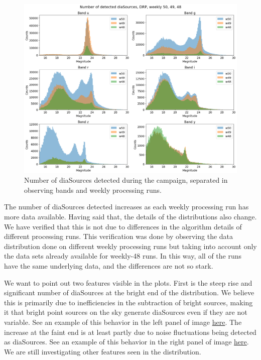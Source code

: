 \begin{figure}
  \includegraphics[width=\textwidth]{dia/figures/diaSources.png}
  \caption{Number of diaSources detected during the campaign, separated in observing bands and weekly processing runs.}
  \label{fig:diaSrc_count}
\end{figure}

The number of diaSources detected increases as each weekly processing run has more data available. Having said that, the details of the distributions also change. We have verified that this is not due to differences in the algorithm details of different processing runs. This verification was done by observing the data distribution done on different weekly processing runs but taking into account only the data sets already available for weekly-48 runs. In this way, all of the runs have the same underlying data, and the differences are not so stark. \par

We want to point out two features visible in the plots. First is the steep rise and significant number of diaSources at the bright end of the distribution. We believe this is primarily due to inefficiencies in the subtraction of bright sources, making it that bright point sources on the sky generate diaSources even if they are not variable. See an example of this behavior in the left panel of image \href{https://rubin-obs.slack.com/archives/C07QM71SZ5J/p1734564452594809?thread_ts=1734547527.434299&cid=C07QM71SZ5J}{here}.
The increase at the faint end is at least partly due to noise fluctuations being detected as diaSources. See an example of this behavior in the right panel of image \href{https://rubin-obs.slack.com/archives/C07QM71SZ5J/p1734564452594809?thread_ts=1734547527.434299&cid=C07QM71SZ5J}{here}. We are still investigating other features seen in the distribution. \par

